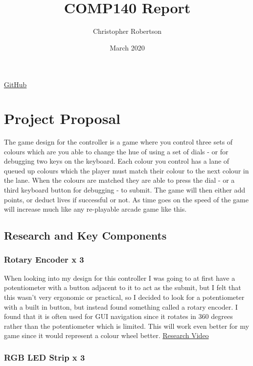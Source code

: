 \documentclass{article}
\title{COMP140 Report}
\author{Christopher Robertson}
\date{March 2020}
\begin{document}
\maketitle
\begin{center}
    \href{https://github.com/Koltonix/comp140-arduino-controller}{GitHub}
\end{center}
\newpage

\section{Project Proposal}

The game design for the controller is a game where you control three sets of colours which are you able to change the hue of using a set of dials - or for debugging two keys on the keyboard. Each colour you control has a lane of queued up colours which the player must match their colour to the next colour in the lane. When the colours are matched they are able to press the dial - or a third keyboard button for debugging - to submit. The game will then either add points, or deduct lives if successful or not. As time goes on the speed of the game will increase much like any re-playable arcade game like this.

\subsection{Research and Key Components}

\subsubsection{Rotary Encoder x 3}

When looking into my design for this controller I was going to at first have a potentiometer with a button adjacent to it to act as the submit, but I felt that this wasn't very ergonomic or practical, so I decided to look for a potentiometer with a built in button, but instead found something called a rotary encoder. I found that it is often used for GUI navigation since it rotates in 360 degrees rather than the potentiometer which is limited. This will work even better for my game since it would represent a colour wheel better. \href{https://www.youtube.com/watch?v=UhYu0k2woRM}{Research Video}

\subsubsection{RGB LED Strip x 3}
\end{document}
